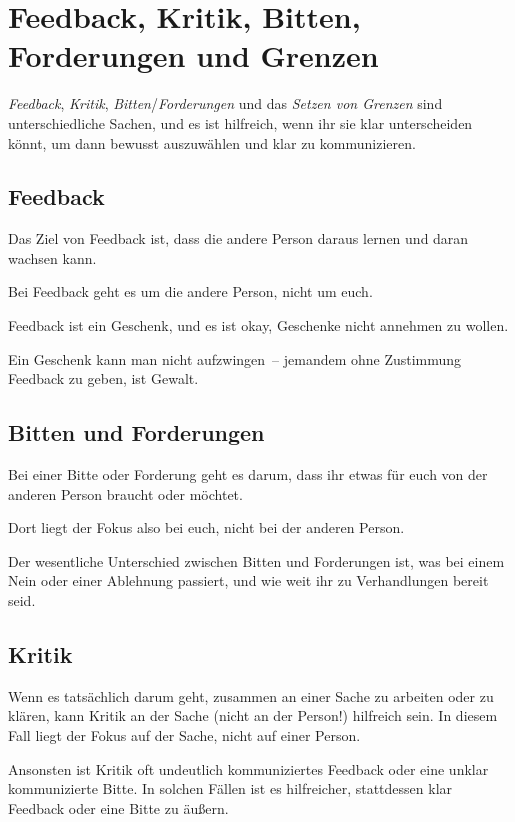 \section{Feedback, Kritik, Bitten, Forderungen und Grenzen}
\label{feedback-vs-kritik}

\emph{Feedback}, \emph{Kritik}, \emph{Bitten}/\emph{Forderungen} und das \emph{Setzen von Grenzen} sind unterschiedliche Sachen, und es ist hilfreich, wenn ihr sie klar unterscheiden könnt, um dann bewusst auszuwählen und klar zu kommunizieren.


\subsection{Feedback}

Das Ziel von Feedback ist, dass die andere Person daraus lernen und daran wachsen kann.

Bei Feedback geht es um die andere Person, nicht um euch.

Feedback ist ein Geschenk, und es ist okay, Geschenke nicht annehmen zu wollen.

Ein Geschenk kann man nicht aufzwingen~-- jemandem ohne Zustimmung Feedback zu geben, ist Gewalt.


\subsection{Bitten und Forderungen}

Bei einer Bitte oder Forderung geht es darum, dass ihr etwas für euch von der anderen Person braucht oder möchtet.

Dort liegt der Fokus also bei euch, nicht bei der anderen Person.

Der wesentliche Unterschied zwischen Bitten und Forderungen ist, was bei einem Nein oder einer Ablehnung passiert, und wie weit ihr zu Verhandlungen bereit seid.


\subsection{Kritik}

Wenn es tatsächlich darum geht, zusammen an einer Sache zu arbeiten oder zu klären, kann Kritik an der Sache (nicht an der Person!) hilfreich sein. In diesem Fall liegt der Fokus auf der Sache, nicht auf einer Person.

Ansonsten ist Kritik oft undeutlich kommuniziertes Feedback oder eine unklar kommunizierte Bitte. In solchen Fällen ist es hilfreicher, stattdessen klar Feedback oder eine Bitte zu äußern.


